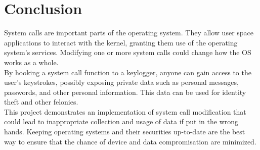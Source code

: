 \documentclass[conference]{IEEEtran}
\newcommand\tab[1][0.5cm]{\hspace*{#1}}
\begin{document}
	\section{Conclusion}
System calls are important parts of the operating system. They allow user space applications to interact with the kernel, granting them use of the operating system's services. Modifying one or more system calls could change how the OS works as a whole.\\ 
\tab By hooking a system call function to a keylogger, anyone can gain access to the user's keystrokes, possibly exposing private data such as personal messages, passwords, and other personal information. This data can be used for identity theft and other felonies.\\
\tab This project demonstrates an implementation of system call modification that could lead to inappropriate collection and usage of data if put in the wrong hands. Keeping operating systems and their securities up-to-date are the best way to ensure that the chance of device and data compromisation are minimized.
	\nocite{*}
	\printbibliography
	
\end{document}
